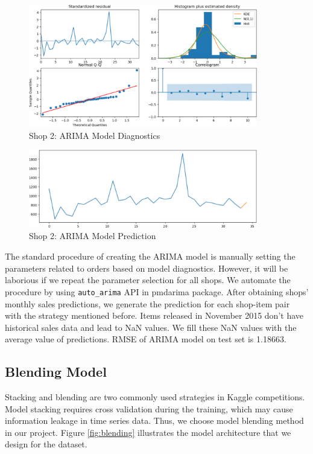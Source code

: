 \documentclass{article}
\begin{document}
\begin{figure}[!ht]
    \centering
    \includegraphics[width=10cm]{./figs/arima-1.png}
    \caption{Shop 2: ARIMA Model Diagnostics}
    \label{fig:arima-1}
\end{figure}

\begin{figure}[!ht]
    \centering
    \includegraphics[width=10cm]{./figs/arima-2.png}
    \caption{Shop 2: ARIMA Model Prediction}
    \label{fig:arima-2}
\end{figure}

The standard procedure of creating the ARIMA model is manually setting the parameters related to orders based on model diagnostics. However, it will be laborious if we repeat the parameter selection for all shops. We automate the procedure by using \texttt{auto\_arima} API in pmdarima package. After obtaining shops' monthly sales predictions, we generate the prediction for each shop-item pair with the strategy mentioned before. Items released in November 2015 don't have historical sales data and lead to NaN values. We fill these NaN values with the average value of predictions. RMSE of ARIMA model on test set is 1.18663.

\subsection{Blending Model} \label{method}
Stacking and blending are two commonly used strategies in Kaggle competitions. Model stacking requires cross validation during the training, which may cause information leakage in time series data. Thus, we choose model blending method in our project. Figure \ref{fig:blending} illustrates the model architecture that we design for the dataset.
\end{document}
